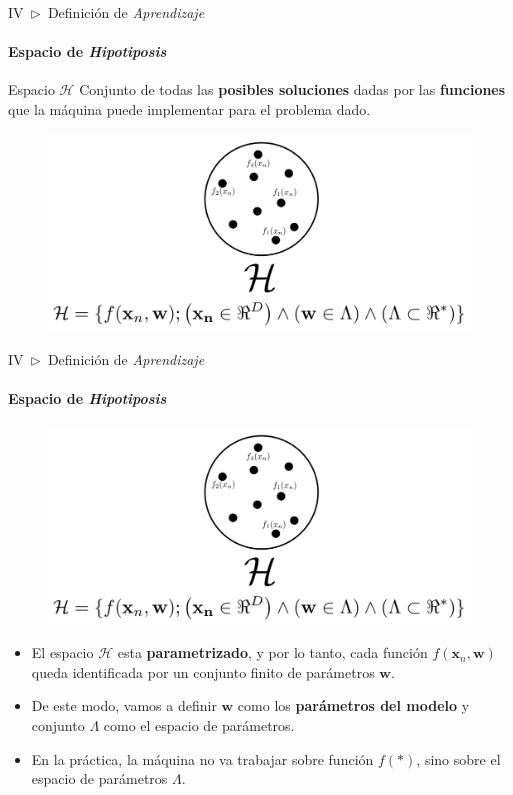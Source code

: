 \documentclass[xcolor=dvipsnames]{beamer}
\begin{document}
    \begin{frame}{IV~$\rhd$~Definición de \textit{Aprendizaje}}
    \framesubtitle{Espacio de \textit{Hipotiposis}}
        \begin{block}{Espacio $\mathcal{H}$}
        Conjunto de todas las \textbf{posibles soluciones} dadas por las \textbf{funciones} que la máquina puede implementar para el problema dado.
        \end{block}
        \begin{figure}
            \centering
            \includegraphics[width=0.8\linewidth]{imgs/def03/measure01.png}
        \end{figure}
    \end{frame}

    \begin{frame}{IV~$\rhd$~Definición de \textit{Aprendizaje}}
    \framesubtitle{Espacio de \textit{Hipotiposis}}
        \begin{figure}
            \centering
            \includegraphics[width=0.55\linewidth]{imgs/def03/measure01.png}
        \end{figure}
        \begin{itemize}
            \item El espacio $\mathcal{H}$ esta \textbf{parametrizado}, y por lo tanto, cada función $f(\mathbf{x}_{n}, \mathbf{w})$ queda identificada por un conjunto finito de parámetros $\mathbf{w}$.
            \item De este modo, vamos a definir $\mathbf{w}$ como los \textbf{parámetros del modelo} y conjunto $\Lambda$ como el espacio de parámetros.
            \item En la práctica, la máquina no va trabajar sobre función $f(*)$, sino sobre el espacio de parámetros $\Lambda$.
        \end{itemize}
    \end{frame}
\end{document}
